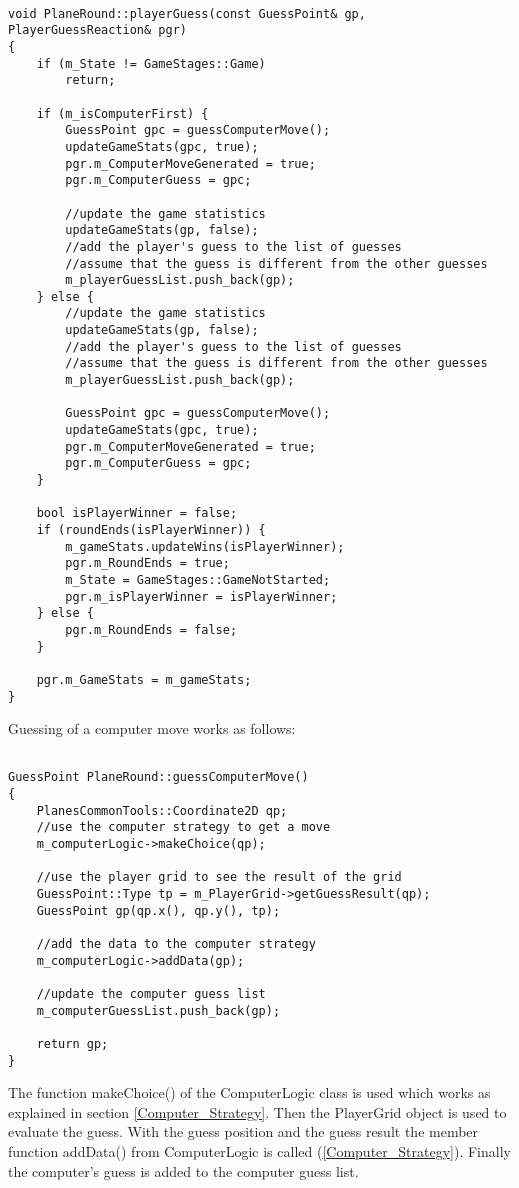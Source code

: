 \begin{lstlisting}

void PlaneRound::playerGuess(const GuessPoint& gp, PlayerGuessReaction& pgr)
{
	if (m_State != GameStages::Game)
		return;

	if (m_isComputerFirst) {
		GuessPoint gpc = guessComputerMove();
		updateGameStats(gpc, true);
		pgr.m_ComputerMoveGenerated = true;
		pgr.m_ComputerGuess = gpc;
	
		//update the game statistics
		updateGameStats(gp, false);
		//add the player's guess to the list of guesses
		//assume that the guess is different from the other guesses
		m_playerGuessList.push_back(gp);
	} else {
		//update the game statistics
		updateGameStats(gp, false);
		//add the player's guess to the list of guesses
		//assume that the guess is different from the other guesses
		m_playerGuessList.push_back(gp);
		
		GuessPoint gpc = guessComputerMove();
		updateGameStats(gpc, true);
		pgr.m_ComputerMoveGenerated = true;
		pgr.m_ComputerGuess = gpc;
	}
	
	bool isPlayerWinner = false;
	if (roundEnds(isPlayerWinner)) {
		m_gameStats.updateWins(isPlayerWinner);
		pgr.m_RoundEnds = true;
		m_State = GameStages::GameNotStarted;
		pgr.m_isPlayerWinner = isPlayerWinner;
	} else {
		pgr.m_RoundEnds = false;
	}
	
	pgr.m_GameStats = m_gameStats;
}
\end{lstlisting}

Guessing of a computer move works as follows:

\begin{lstlisting}

GuessPoint PlaneRound::guessComputerMove()
{
	PlanesCommonTools::Coordinate2D qp;
	//use the computer strategy to get a move
	m_computerLogic->makeChoice(qp);
	
	//use the player grid to see the result of the grid
	GuessPoint::Type tp = m_PlayerGrid->getGuessResult(qp);
	GuessPoint gp(qp.x(), qp.y(), tp);
	
	//add the data to the computer strategy
	m_computerLogic->addData(gp);
	
	//update the computer guess list
	m_computerGuessList.push_back(gp);
	
	return gp;
}

\end{lstlisting}

The function makeChoice() of the ComputerLogic class is used which works as explained in section \ref{Computer_Strategy}. Then the PlayerGrid object is used to evaluate the guess. With the guess position and the guess result the member function addData() from ComputerLogic is called (\ref{Computer_Strategy}). Finally the computer's guess is added to the computer guess list. 

